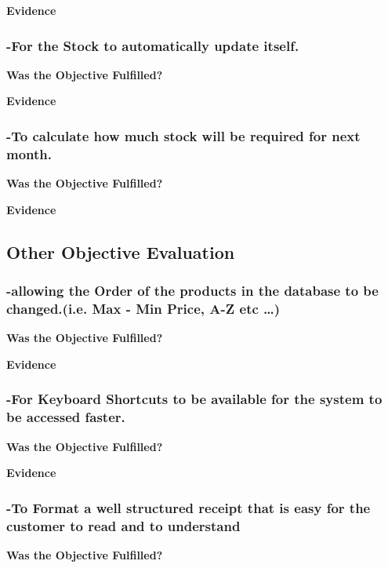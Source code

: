\textbf{Evidence} \newline



\subsubsection{-For the Stock to automatically update itself.}
\textbf{Was the Objective Fulfilled?} \newline

\textbf{Evidence} \newline




\subsubsection{-To calculate how much stock will be required for next month.}
\textbf{Was the Objective Fulfilled?} \newline

\textbf{Evidence} \newline



\subsection{Other Objective Evaluation}


\subsubsection{-allowing the Order of the products in the database to be changed.(i.e. Max - Min Price, A-Z etc \ldots)}
\textbf{Was the Objective Fulfilled?} \newline

\textbf{Evidence} \newline



\subsubsection{-For Keyboard Shortcuts to be available for the system to be accessed faster.}
\textbf{Was the Objective Fulfilled?} \newline

\textbf{Evidence} \newline



\subsubsection{-To Format a well structured receipt that is easy for the customer to read and to understand}
\textbf{Was the Objective Fulfilled?} \newline


